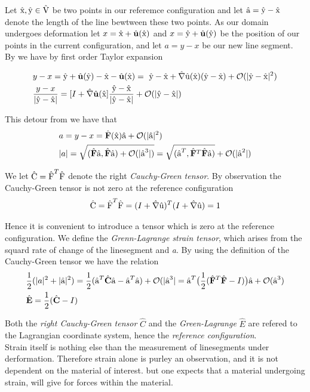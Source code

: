 Let $\text{\^{x}}, \text{\^{y}} \in \text{\^{V}}$ be two points in our referemce configuration and let $\text{\^{a}} = \text{\^{y}} - \text{\^{x}}$ denote the
length of the line bewtween these two points. As our domain undergoes deformation let 
$x = \ha{x} + \hat{u}( \ha{x} ) $ and $x = \ha{y} + \hat{u}( \ha{y} )  $ be the position of our points in the current configuration, and let $a = y - x$ be our new line segment. By \cite{Richter2016} we have by first order Taylor expansion

\begin{align*}
&y - x = \ha{y} + \hat{u}(\ha{y}) - \ha{x} - \hat{u}(\ha{x}) = \
\ha{y} - \ha{x} + \hat{\nabla}\ha{u}(\ha{x}) (\ha{y} - \ha{x}) 
+ \mathcal{O}(|\ha{y} - \ha{x} |^2) \\
&\frac{y - x}{|\ha{y} - \ha{x}|} = [I + \hat{\nabla}\hat{u}(\ha{x} ]  
\frac{\ha{y} - \ha{x}}{|\ha{y} - \ha{x}|} + \mathcal{O}(|\ha{y} - \ha{x} |) 
\end{align*}

This detour from \cite{Richter2016}  we have that 
\begin{align*}
&a = y - x = \hat{F}(\ha{x})\ha{a} +  \mathcal{O}(|\ha{a} |^2) \\
&|a| = \sqrt{ (\hat{F}\ha{a},\hat{F}\ha{a})+ \mathcal{O} (|\ha{a}^3|)  } = 
 \sqrt{ (\ha{a}^T, \hat{F}^T\hat{F}\ha{a})} + \mathcal{O} (|\ha{a}^2|)  
\end{align*}

We let $\text{\^{C}} = \text{\^{F}}^T \text{\^{F}}$ denote the right \textit{Cauchy-Green tensor}.
By observation the Cauchy-Green tensor is not zero at the reference configuration 
\begin{align*}
\ha{C} =  \ha{F}^T \ha{F} = (I + \hat{\nabla} \ha{u})^T (I + \hat{\nabla} \ha{u}) = 1
\end{align*}

Hence it is convenient to introduce a tensor which is zero at the reference configuration. We define the \textit{Grenn-Lagrange strain tensor}, which arises from the squard rate of change of the linesegment  and \textit{a}. By using the definition of the Cauchy-Green tensor we have the relation
\begin{align*}
&\frac{1}{2}(|a|^2 + |\ha{a}|^2) = \frac{1}{2}(\ha{a}^T\hat{C}\ha{a}
 -\ha{a}^T \ha{a} ) + \mathcal{O}(|\ha{a}^3| = 
 \ha{a}^T \big(\frac{1}{2} (\hat{F}^T \hat{F} - I) \big) \ha{a} 
 + \mathcal{O}(\ha{a}^3) \\
&\hat{E} = \frac{1}{2}(\hat{C} - I)
\end{align*}

Both the \textit{right Cauchy-Green tensor} $\hat{C}$ and the \textit{Green-Lagrange} $\hat{E}$ are refered to the Lagrangian coordinate system, hence the \textit{reference configuration}. \\
Strain itself is nothing else than the measurement of linesegments under derformation. Therefore strain alone is purley an observation, and it is not dependent on the material of interest. but one expects that a material undergoing strain, will give for forces within the material. \\


